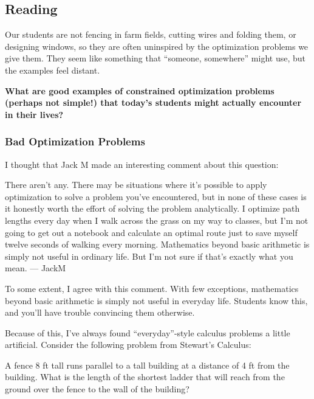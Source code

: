 


\subsection*{Reading}
Our students are not fencing in farm fields, cutting wires and folding them, or designing windows, so they are often uninspired by the
optimization problems we give them. They seem like something that ``someone, somewhere'' might use, but the examples feel distant.

\textbf{What are good examples of constrained optimization problems (perhaps not simple!) that today's students might actually encounter in their lives?}

\subsubsection*{Bad Optimization Problems}
I thought that Jack M made an interesting comment about this question:

\begin{adjustwidth}{1cm}{}
    There aren't any. There may be situations where it's possible to apply optimization to solve a problem you've encountered, but in none of these cases is it honestly worth the effort of solving the problem analytically. I optimize path lengths every day when I walk across the grass on my way to classes, but I'm not going to get out a notebook and calculate an optimal route just to save myself twelve seconds of walking every morning. Mathematics beyond basic arithmetic is simply not useful in ordinary life. But I'm not sure if that's exactly what you mean. --- JackM
\end{adjustwidth}

To some extent, I agree with this comment. With few exceptions, mathematics beyond basic arithmetic is simply not useful in everyday life. Students know this, and you'll have trouble convincing them otherwise.

Because of this, I've always found ``everyday''-style calculus problems a little artificial. Consider the following problem from Stewart's Calculus:
\begin{adjustwidth}{1cm}{}
    A fence 8 ft tall runs parallel to a tall building at a distance of 4 ft from the building. What is the length of the shortest ladder that will reach from the ground over the fence to the wall of the building?
\end{adjustwidth}

